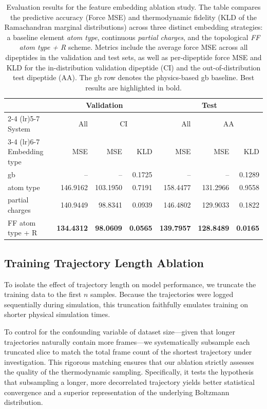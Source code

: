 \begin{table}[htbp]
\centering
\caption{Evaluation results for the feature embedding ablation study. The table compares the predictive accuracy (Force MSE) and thermodynamic fidelity (KLD of the Ramachandran marginal distributions) across three distinct embedding strategies: a baseline element \textit{atom type}, continuous \textit{partial charges}, and the topological \textit{FF atom type + R} scheme. Metrics include the average force MSE across all dipeptides in the validation and test sets, as well as per-dipeptide force MSE and KLD for the in-distribution validation dipeptide (CI) and the out-of-distribution test dipeptide (AA). The \gls{gb} row denotes the physics-based \gls{gb} baseline. Best results are highlighted in bold.}
\label{tab:embedding_ablation}
\begin{tabular}{l r r r r r r}
\toprule
& \multicolumn{3}{c}{Validation} & \multicolumn{3}{c}{Test} \\
\cmidrule(lr){2-4} \cmidrule(lr){5-7}
System & All & \multicolumn{2}{c}{CI} & All & \multicolumn{2}{c}{AA} \\
\cmidrule(lr){3-4} \cmidrule(lr){6-7}
Embedding type & MSE & MSE & KLD & MSE & MSE & KLD \\
\midrule
\gls{gb} & -- & -- & 0.1725 & -- & -- & 0.1289 \\
\midrule
atom type & 146.9162 & 103.1950 & 0.7191 & 158.4477 & 131.2966 & 0.9558 \\
partial charges & 140.9449 & 98.8341 & 0.0939 & 146.4802 & 129.9033 & 0.1822 \\
FF atom type + R & \textbf{134.4312} & \textbf{98.0609} & \textbf{0.0565} & \textbf{139.7957} & \textbf{128.8489} & \textbf{0.0165} \\
\bottomrule
\end{tabular}
\end{table}


\subsection{Training Trajectory Length Ablation}

To isolate the effect of trajectory length on model performance, we truncate the training data to the first $n$ samples. Because the trajectories were logged sequentially during simulation, this truncation faithfully emulates training on shorter physical simulation times. 

To control for the confounding variable of dataset size—given that longer trajectories naturally contain more frames—we systematically subsample each truncated slice to match the total frame count of the shortest trajectory under investigation. This rigorous matching ensures that our ablation strictly assesses the quality of the thermodynamic sampling. Specifically, it tests the hypothesis that subsampling a longer, more decorrelated trajectory yields better statistical convergence and a superior representation of the underlying Boltzmann distribution.

